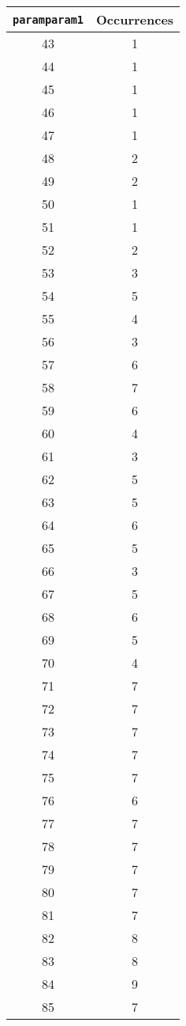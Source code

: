 \documentclass[letterpaper, 12pt]{article}
\begin{document}
\begin{longtable}{|c|c|}
\hline
\textbf{\texttt{paramparam1}} & \textbf{Occurrences} \\
\hline
43 & 1 \\
\hline
44 & 1 \\
\hline
45 & 1 \\
\hline
46 & 1 \\
\hline
47 & 1 \\
\hline
48 & 2 \\
\hline
49 & 2 \\
\hline
50 & 1 \\
\hline
51 & 1 \\
\hline
52 & 2 \\
\hline
53 & 3 \\
\hline
54 & 5 \\
\hline
55 & 4 \\
\hline
56 & 3 \\
\hline
57 & 6 \\
\hline
58 & 7 \\
\hline
59 & 6 \\
\hline
60 & 4 \\
\hline
61 & 3 \\
\hline
62 & 5 \\
\hline
63 & 5 \\
\hline
64 & 6 \\
\hline
65 & 5 \\
\hline
66 & 3 \\
\hline
67 & 5 \\
\hline
68 & 6 \\
\hline
69 & 5 \\
\hline
70 & 4 \\
\hline
71 & 7 \\
\hline
72 & 7 \\
\hline
73 & 7 \\
\hline
74 & 7 \\
\hline
75 & 7 \\
\hline
76 & 6 \\
\hline
77 & 7 \\
\hline
78 & 7 \\
\hline
79 & 7 \\
\hline
80 & 7 \\
\hline
81 & 7 \\
\hline
82 & 8 \\
\hline
83 & 8 \\
\hline
84 & 9 \\
\hline
85 & 7 \\

\end{longtable}
\end{document}
